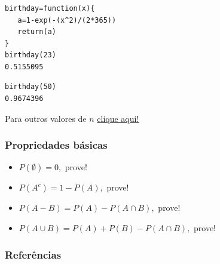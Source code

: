 \documentclass[14pt,aspectratio=1610]{beamer}
\begin{document}
\begin{frame}[fragile]{}
\frametitle{}
\begin{block}{}
\justifying
\begin{verbatim}
birthday=function(x){
   a=1-exp(-(x^2)/(2*365))
   return(a)
}
birthday(23)
0.5155095
\end{verbatim}
\pause

\begin{verbatim}
birthday(50) 
0.9674396
\end{verbatim}
\pause

Para outros valores de $n$ \href{https://ufvest.shinyapps.io/ApostilaInterativa/#section-exemplos-classicos}{clique aqui!}
\end{block}
\end{frame}

\begin{frame}{}
\frametitle{Propriedades básicas}
\begin{block}{}
\begin{itemize}
\item $P(\emptyset)=0,$ prove!\pause
\item $P(A^{c})=1-P(A),$ prove!\pause
\item $P(A-B)=P(A)-P(A\cap B),$ prove!\pause
\item $P(A\cup B)=P(A)+P(B)-P(A\cap B),$ prove!
\end{itemize}
\end{block}
\nocite{Morettin09, Apostila, eric, montgomery2016, meyer1982probabilidade, Bastos2025}
\end{frame}

\begin{frame}[allowframebreaks]
	\frametitle{\bf Referências}
	\printbibliography
\end{frame}
\end{document}
